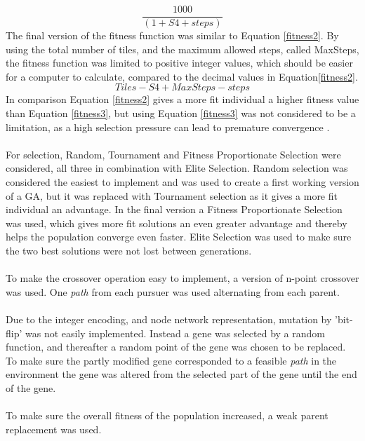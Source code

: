 %
\begin{equation}\label{fitness2} \frac{1000}{(1+S4+steps)} \end{equation}
%
The final version of the fitness function was similar to Equation \eqref{fitness2}. By using the total number of tiles, and the maximum allowed steps, called MaxSteps, the fitness function was limited to positive integer values, which should be easier for a computer to calculate, compared to the decimal values in Equation\eqref{fitness2}.
%
\begin{equation} \label{fitness3}Tiles-S4+MaxSteps-steps \end{equation}
%
In comparison Equation \eqref{fitness2} gives a more fit individual a higher fitness value than Equation \eqref{fitness3}, but using Equation \eqref{fitness3} was not considered to be a limitation, as a high selection pressure can lead to premature convergence \cite{GAHandbook1}.\\\\
For selection, Random, Tournament  and Fitness Proportionate Selection were considered, all three in combination with Elite Selection. Random selection was considered the easiest to implement and was used to create a first working version of a GA, but it was replaced with Tournament selection as it gives a more fit individual an advantage. In the final version a Fitness Proportionate Selection was used, which gives more fit solutions an even greater advantage and thereby helps the population converge even faster. Elite Selection was used to make sure the two best solutions were not lost between generations.\\\\
To make the crossover operation easy to implement, a version of n-point crossover was used. One \emph{path} from each pursuer was used alternating from each parent.\\\\
Due to the integer encoding, and node network representation, mutation by 'bit-flip' was not easily implemented. Instead a gene was selected by a random function, and thereafter a random point of the gene was chosen to be replaced. To make sure the partly modified gene corresponded to a feasible \emph{path} in the environment the gene was altered from the selected part of the gene until the end of the gene.\\\\
To make sure the overall fitness of the population increased, a weak parent replacement was used.\\\\
